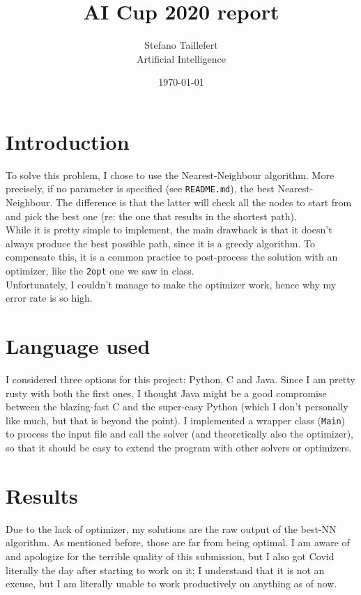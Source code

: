 \documentclass[12pt]{article}
\title{AI Cup 2020 report}
\author{Stefano Taillefert\\
Artificial Intelligence}
\date{\today}
\begin{document}
\maketitle

\section{Introduction}

To solve this problem, I chose to use the Nearest-Neighbour algorithm. More precisely, if no parameter is specified (see \texttt{README.md}), the best Nearest-Neighbour.
The difference is that the latter will check all the nodes to start from and pick the best one (re: the one that results in the shortest path).\\

While it is pretty simple to implement, the main drawback is that it doesn't always produce the best possible path, since it is a greedy algorithm. To compensate this, it is a common practice to post-process the solution with an optimizer, like the \texttt{2opt} one we saw in class.\\

Unfortunately, I couldn't manage to make the optimizer work, hence why my error rate is so high.


\section{Language used}

I considered three options for this project: Python, C and Java. Since I am pretty rusty with both the first ones, I thought Java might be a good compromise between the blazing-fast C and the super-easy Python (which I don't personally like much, but that is beyond the point). I implemented a wrapper class (\texttt{Main}) to process the input file and call the solver (and theoretically also the optimizer), so that it should be easy to extend the program with other solvers or optimizers.
	
	
\section{Results}

Due to the lack of optimizer, my solutions are the raw output of the best-NN algorithm. As mentioned before, those are far from being optimal. I am aware of and apologize for the terrible quality of this submission, but I also got Covid literally the day after starting to work on it; I understand that it is not an excuse, but I am literally unable to work productively on anything as of now.
\end{document}
